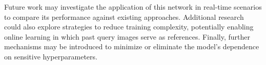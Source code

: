 \documentclass[letterpaper, 10 pt, conference]{ieeeconf}  %
\begin{document}

Future work may investigate the application of this network in real-time scenarios to compare its performance against existing approaches. Additional research could also explore strategies to reduce training complexity, potentially enabling online learning in which past query images serve as references. Finally, further mechanisms may be introduced to minimize or eliminate the model’s dependence on sensitive hyperparameters.



\end{document}
